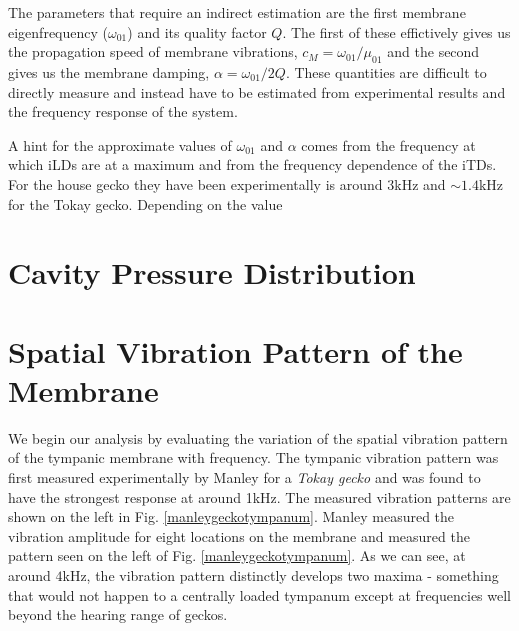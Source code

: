 The parameters that require an indirect estimation are the first membrane eigenfrequency ($\omega_{01}$) and
its quality factor $Q$. The first of these effictively gives us the propagation speed of membrane vibrations, $c_M=\omega_{01}/\mu_{01}$ 
and the second gives us the membrane damping, $\alpha=\omega_{01}/2Q$. These quantities are difficult to directly measure and instead
have to be estimated from experimental results and the frequency response of the system. 

A hint for the approximate values of $\omega_{01}$
and $\alpha$ comes from the frequency at which iLDs are at a maximum and from the frequency dependence of the iTDs. For the house gecko they have been experimentally is around $3$kHz and
 $\sim 1.4$kHz for the Tokay gecko. Depending on the value
\section{Cavity Pressure Distribution}\label{pressuredistchapter}

\section{Spatial Vibration Pattern of the Membrane}\label{vibrationpatternchapter}
We begin our analysis by evaluating the variation of the spatial vibration pattern of the tympanic membrane
with frequency. The tympanic vibration pattern was first measured experimentally by Manley \cite{manleygecko1}
for a \textit{Tokay gecko} and was found to have the strongest response at around 1kHz. The measured vibration patterns
are shown on the left in Fig. \ref{manleygeckotympanum}. Manley measured the vibration amplitude for eight locations on the membrane and measured the pattern
seen on the left of Fig. \ref{manleygeckotympanum}. As we can see, at around $4$kHz, the vibration pattern
distinctly develops two maxima - something that would not happen to a centrally loaded tympanum except
at frequencies well beyond the hearing range of geckos.

